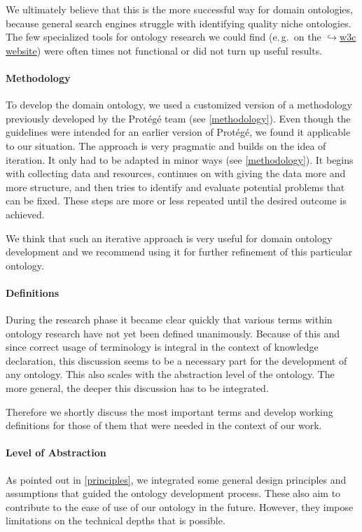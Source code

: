 \documentclass[a4paper, DIV=13, BCOR=0cm]{scrbook}
\newcommand{\eg}{e.\,g.\ }
\newcommand{\link}[2]{\href{#1}{$\hookrightarrow$#2}}
\begin{document}
We ultimately believe that this is the more successful way for domain ontologies, because general search engines struggle with identifying quality niche ontologies. The few specialized tools for ontology research we could find (\eg on the \link{https://www.w3.org/wiki/Search_engines}{\gls{w3c} website}) were often times not functional or did not turn up useful results.

\paragraph{Methodology}
To develop the domain ontology, we used a customized version of a methodology previously developed by the Protégé team (see \autoref{methodology}). Even though the guidelines were intended for an earlier version of Protégé, we found it applicable to our situation. The approach is very pragmatic and builds on the idea of iteration. It only had to be adapted in minor ways (see \autoref{methodology}). It begins with collecting data and resources, continues on with giving the data more and more structure, and then tries to identify and evaluate potential problems that can be fixed. These steps are more or less repeated until the desired outcome is achieved.

We think that such an iterative approach is very useful for domain ontology development and we recommend using it for further refinement of this particular ontology.

\paragraph{Definitions}
During the research phase it became clear quickly that various terms within ontology research have not yet been defined unanimously. Because of this and since correct usage of terminology is integral in the context of knowledge declaration, this discussion seems to be a necessary part for the development of any ontology. This also scales with the abstraction level of the ontology. The more general, the deeper this discussion has to be integrated.

Therefore we shortly discuss the most important terms and develop working definitions for those of them that were needed in the context of our work.

\paragraph{Level of Abstraction}
As pointed out in \autoref{principles}, we integrated some general design principles and assumptions that guided the ontology development process. These also aim to contribute to the ease of use of our ontology in the future. However, they impose limitations on the technical depths that is possible.
\end{document}
